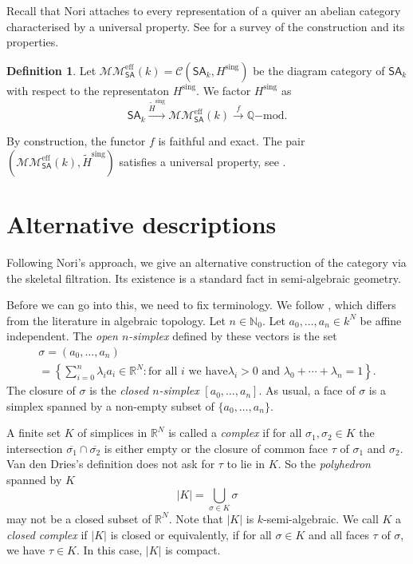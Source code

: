 \documentclass[11pt,a4paper]{amsart}
\theoremstyle{definition}
\newtheorem{defn}[lemma]{Definition}
\newcommand{\MMSA}{\mathcal{MM}_{\SA}}
\newcommand{\Ch}{\mathcal{C}}
\newcommand{\eff}{\mathrm{eff}}
\newcommand{\Qmod}{\Q\mathrm{-mod}}
\newcommand{\sing}{\mathrm{sing}}
\newcommand{\Hsing}{H^\sing}
\newcommand{\Hsingtilde}{\tilde{H}^\sing}
\newcommand{\SA}{\mathsf{SA}}
\newcommand{\Q}{\mathbb{Q}}
\newcommand{\R}{\mathbb{R}}
\newcommand{\Na}{\mathbb{N}}
\begin{document}
Recall that Nori attaches to every representation of a quiver an abelian category characterised by a universal property. See \cite[Chapter~7.1]{period-buch} for a survey of the construction and its properties.

\begin{defn}Let $\MMSA^\eff(k)=\Ch(\SA_k,\Hsing)$ be the diagram category of $\SA_k$ with respect to the representaton $\Hsing$. We factor $\Hsing$ as
\[ \SA_k\xrightarrow{\Hsingtilde}\MMSA^\eff(k)\xrightarrow{f}\Qmod.\]
\end{defn}
By construction, the functor $f$ is faithful and exact. The pair
$(\MMSA^\eff(k),\Hsingtilde)$ satisfies a universal property, see \cite[Theorem~7.1.13]{period-buch}.

\section{Alternative descriptions}
Following Nori's approach, we give an alternative construction of the category via the skeletal filtration. Its existence is a standard fact in semi-algebraic geometry.

Before we can go into this, we need to fix terminology. We follow \cite[Chapter~8]{D:oMin}, which differs from the literature in algebraic topology.
Let $n\in\Na_0$. Let $a_0,\dots,a_n\in k^N$ be affine independent.
The \emph{open $n$-simplex} defined by these vectors is the set
\begin{multline*}
\sigma = (a_0,\ldots,a_n)\\
=\left\{ \sum_{i=0}^n \lambda_i a_i \in\R^N:  \text{for all $i$ we have
$\lambda_i>0$ and }\lambda_0+\cdots + \lambda_n =
1\right\}.
\end{multline*}
The closure of $\sigma$ is the \emph{closed $n$-simplex} $[a_0,\ldots,a_n]$.
As usual, a face of $\sigma$ is a simplex spanned by a non-empty
subset of $\{a_0,\ldots,a_n\}$.

A finite set $K$ of simplices in $\R^N$ is called a \emph{complex} if
for all $\sigma_1,\sigma_2\in K$ the intersection
$\overline{\sigma_1}\cap\overline{\sigma_2}$ is either empty or the
closure of common face $\tau$ of $\sigma_1$ and $\sigma_2$.
Van den Dries's definition does not ask for $\tau$ to lie in $K$. So
the \emph{polyhedron} spanned by $K$
$$|K|  = \bigcup_{\sigma \in K} \sigma$$
may not be a closed subset of $\R^N$.
Note that $|K|$ is $k$-semi-algebraic. 
We call $K$ a \emph{closed complex} if $|K|$ is closed or equivalently,
if for all $\sigma\in K$ and all faces $\tau$ of $\sigma$, we have $\tau\in K$.
In this case, $|K|$ is compact.
\end{document}
